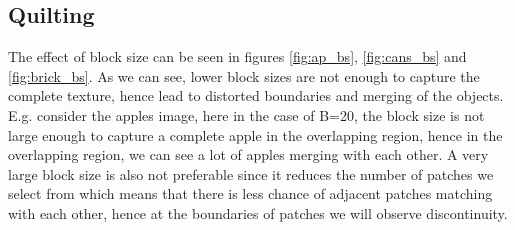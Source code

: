 \documentclass[10pt,twocolumn,letterpaper]{article}
\begin{document}
\subsection{Quilting}
The effect of block size can be seen in figures \ref{fig:ap_bs}, \ref{fig:cans_bs} and \ref{fig:brick_bs}. As we can see, lower block sizes are not enough to capture the complete texture, hence lead to distorted boundaries and merging of the objects. E.g. consider the apples image, here in the case of B=20, the block size is not large enough to capture a complete apple in the overlapping region, hence in the overlapping region, we can see a lot of apples merging with each other. A very large block size is also not preferable since it reduces the number of patches we select from which means that there is less chance of adjacent patches matching with each other, hence at the boundaries of patches we will observe discontinuity.
\end{document}
